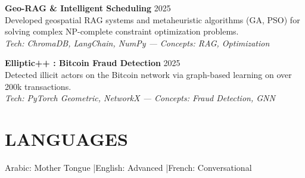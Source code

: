 \documentclass[a4paper,12pt]{article}
\begin{document}
{\textbf{Geo-RAG \& Intelligent Scheduling} \hfill 2025 \\
Developed geospatial RAG systems and metaheuristic algorithms (GA, PSO) for solving complex NP-complete constraint optimization problems. \\
\textit{Tech: ChromaDB, LangChain, NumPy — Concepts: RAG, Optimization}

\textbf{Elliptic++ : Bitcoin Fraud Detection} \hfill 2025 \\
Detected illicit actors on the Bitcoin network via graph-based learning on over 200k transactions. \\
\textit{Tech: PyTorch Geometric, NetworkX — Concepts: Fraud Detection, GNN}
}

\section{LANGUAGES}
Arabic: Mother Tongue \quad|\quad English: Advanced \quad|\quad French: Conversational
\end{document}

